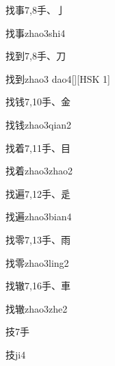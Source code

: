 \begin{Entry}{找事}{7,8}{⼿、⼅}
  \begin{Phonetics}{找事}{zhao3shi4}
  \end{Phonetics}
\end{Entry}

\begin{Entry}{找到}{7,8}{⼿、⼑}
  \begin{Phonetics}{找到}{zhao3 dao4}[][HSK 1]
  \end{Phonetics}
\end{Entry}

\begin{Entry}{找钱}{7,10}{⼿、⾦}
  \begin{Phonetics}{找钱}{zhao3qian2}
  \end{Phonetics}
\end{Entry}

\begin{Entry}{找着}{7,11}{⼿、⽬}
  \begin{Phonetics}{找着}{zhao3zhao2}
  \end{Phonetics}
\end{Entry}

\begin{Entry}{找遍}{7,12}{⼿、⾡}
  \begin{Phonetics}{找遍}{zhao3bian4}
  \end{Phonetics}
\end{Entry}

\begin{Entry}{找零}{7,13}{⼿、⾬}
  \begin{Phonetics}{找零}{zhao3ling2}
  \end{Phonetics}
\end{Entry}

\begin{Entry}{找辙}{7,16}{⼿、⾞}
  \begin{Phonetics}{找辙}{zhao3zhe2}
  \end{Phonetics}
\end{Entry}

\begin{Entry}{技}{7}{⼿}
  \begin{Phonetics}{技}{ji4}
  \end{Phonetics}
\end{Entry}

